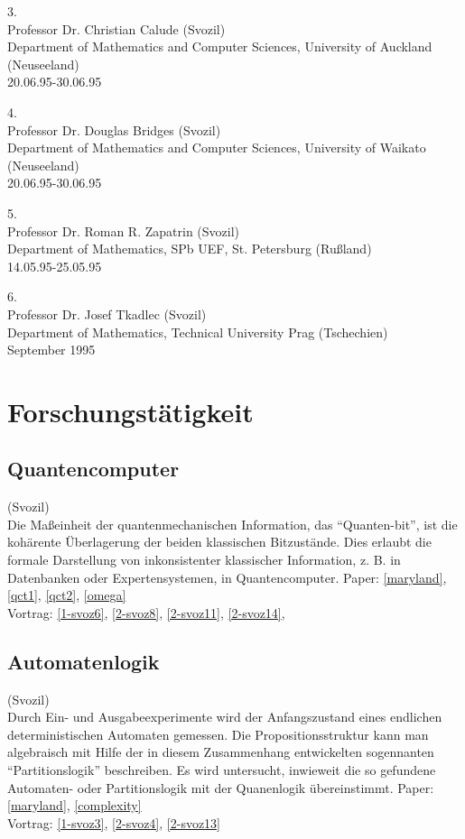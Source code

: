 3.\\
Professor Dr. Christian Calude (Svozil)\\
Department of Mathematics and Computer Sciences, University of
Auckland (Neuseeland)\\
20.06.95-30.06.95


4.\\
Professor Dr. Douglas Bridges (Svozil)\\
Department of Mathematics and Computer Sciences, University of
Waikato (Neuseeland)\\
20.06.95-30.06.95

5.\\
Professor Dr.
Roman R. Zapatrin (Svozil)\\
Department of Mathematics, SPb UEF,
St. Petersburg (Ru\ss land)\\
14.05.95-25.05.95

6.\\
Professor Dr.
Josef Tkadlec (Svozil)\\
Department of Mathematics, Technical University
Prag (Tschechien)\\
September 1995



\section{Forschungst\"atigkeit}

\subsection{Quantencomputer}
(Svozil)\\
Die Ma\ss einheit der quantenmechanischen Information, das
``Quanten-bit'', ist die koh\"arente \"Uberlagerung der beiden
klassischen Bitzust\"ande.
Dies erlaubt die formale Darstellung von inkonsistenter klassischer
Information, z. B. in Datenbanken oder Expertensystemen, in
Quantencomputer.
Paper:
\ref{maryland},
\ref{qct1},
\ref{qct2},
\ref{omega}
\\
Vortrag:
\ref{1-svoz6},
\ref{2-svoz8},
\ref{2-svoz11},
\ref{2-svoz14},
\\

\subsection{Automatenlogik}
(Svozil)\\
Durch Ein- und Ausgabeexperimente wird der Anfangszustand eines
endlichen deterministischen Automaten gemessen. Die Propositionsstruktur
kann man algebraisch mit Hilfe der in diesem Zusammenhang entwickelten
sogennanten
``Partitionslogik'' beschreiben.
Es wird untersucht, inwieweit die so gefundene Automaten- oder
Partitionslogik mit der Quanenlogik \"ubereinstimmt.
Paper:
\ref{maryland},
\ref{complexity}
\\
Vortrag:
\ref{1-svoz3},
\ref{2-svoz4},
\ref{2-svoz13}
\\



